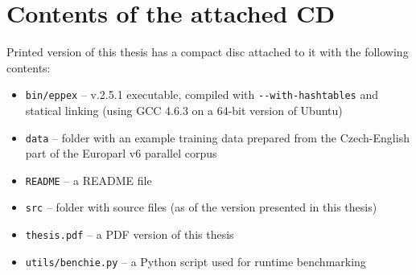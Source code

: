 \chapter{Contents of the attached CD}
\label{chap:cd-contents}

Printed version of this thesis has a compact disc attached to it with the following contents:
\begin{itemize}
  \item \texttt{bin/eppex} -- \eppex{} v.2.5.1 executable, compiled with \verb|--with-hashtables| and
    statical linking (using GCC 4.6.3 on a 64-bit version of Ubuntu)
  \item \texttt{data} -- folder with an example training data prepared from
    the Czech-English part of the Europarl v6 parallel corpus
  \item \texttt{README} -- a README file
  \item \texttt{src} -- folder with \eppex{} source files
    (as of the \eppex{} version presented in this thesis)
  \item \texttt{thesis.pdf} -- a PDF version of this thesis
  \item \texttt{utils/benchie.py} -- a Python script used for runtime benchmarking
\end{itemize}
